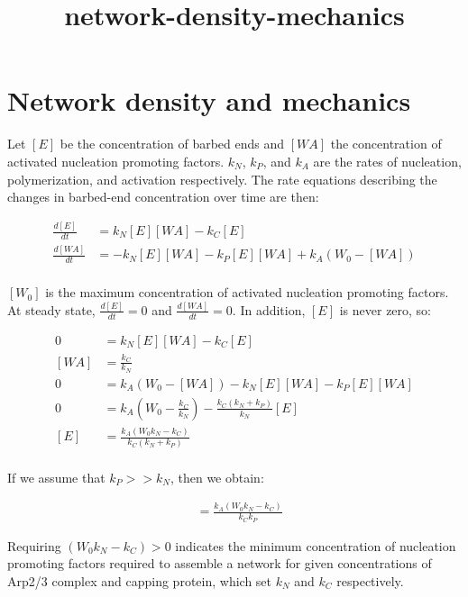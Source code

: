 \documentclass[11pt]{article}
\title{network-density-mechanics}
\begin{document}
    
    
    \maketitle
    
    

    
    \section{Network density and
mechanics}\label{network-density-and-mechanics}

Let \([E]\) be the concentration of barbed ends and \([WA]\) the
concentration of activated nucleation promoting factors. \(k_N\),
\(k_P\), and \(k_A\) are the rates of nucleation, polymerization, and
activation respectively. The rate equations describing the changes in
barbed-end concentration over time are then:

\begin{align*}
\frac{d[E]}{dt} &= k_N[E][WA]-k_C[E] \\
\frac{d[WA]}{dt} &= -k_N[E][WA]-k_P[E][WA]+k_A\left(W_0-[WA]\right) \\
\end{align*}

\([W_0]\) is the maximum concentration of activated nucleation promoting
factors. At steady state, \(\frac{d[E]}{dt} = 0\) and
\(\frac{d[WA]}{dt} = 0\). In addition, \([E]\) is never zero, so:

\begin{align*}
0 &= k_N [E][WA] - k_C [E] \\
[WA] &= \frac{k_C}{k_N} \\
0 &= k_A (W_0 - [WA]) - k_N [E][WA] - k_P [E][WA] \\
0 &= k_A (W_0 - \frac{k_C}{k_N}) - \frac{ k_C (k_N + k_P)}{k_N} [E] \\
[E] &= \frac{k_A (W_0 k_N - k_C)}{k_C (k_N + k_P)} \\
\end{align*}

If we assume that \(k_P >> k_N\), then we obtain:

\begin{align*}
[E] &= \frac{k_A (W_0 k_N - k_C)}{k_C k_P}
\end{align*}

Requiring \((W_0 k_N - k_C) > 0\) indicates the minimum concentration of
nucleation promoting factors required to assemble a network for given
concentrations of Arp2/3 complex and capping protein, which set \(k_N\)
and \(k_C\) respectively.
\end{document}
